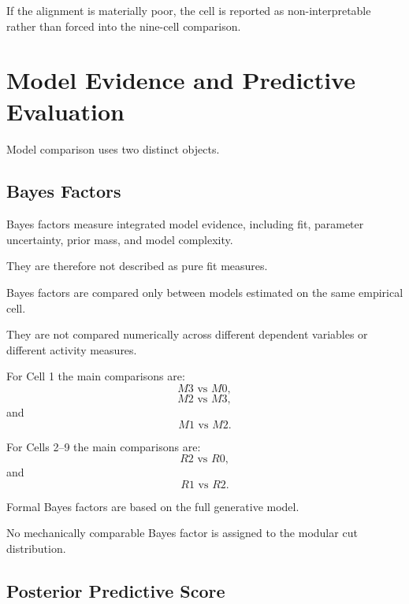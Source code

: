 \documentclass[11pt]{article}
\begin{document}
If the alignment is materially poor, the cell is reported as non-interpretable rather than forced into the nine-cell comparison.

\section{Model Evidence and Predictive Evaluation}

Model comparison uses two distinct objects.

\subsection{Bayes Factors}

Bayes factors measure integrated model evidence, including fit, parameter uncertainty, prior mass, and model complexity.

They are therefore not described as pure fit measures.

Bayes factors are compared only between models estimated on the same empirical cell.

They are not compared numerically across different dependent variables or different activity measures.

For Cell 1 the main comparisons are:
\begin{equation}
M3\text{ vs }M0,
\end{equation}
\begin{equation}
M2\text{ vs }M3,
\end{equation}
and
\begin{equation}
M1\text{ vs }M2.
\end{equation}

For Cells 2--9 the main comparisons are:
\begin{equation}
R2\text{ vs }R0,
\end{equation}
and
\begin{equation}
R1\text{ vs }R2.
\end{equation}

Formal Bayes factors are based on the full generative model.

No mechanically comparable Bayes factor is assigned to the modular cut distribution.

\subsection{Posterior Predictive Score}
\end{document}
